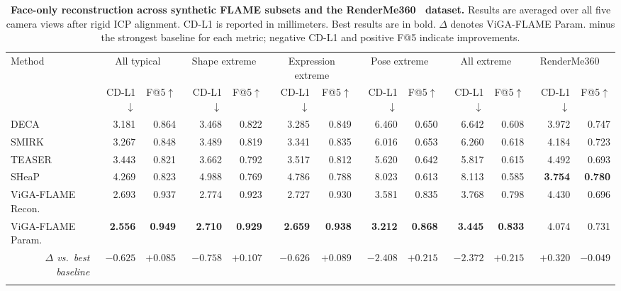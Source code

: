 \begin{table}[htbp]
\centering
\scriptsize
\renewcommand{\arraystretch}{0.95}
\caption{\textbf{Face-only reconstruction across synthetic FLAME subsets and the RenderMe360~\cite{pan2023renderme} dataset.}
Results are averaged over all five camera views after rigid ICP alignment.
CD-L1 is reported in millimeters. Best results are in bold.
$\Delta$ denotes ViGA-FLAME Param. minus the strongest baseline for each metric;
negative CD-L1 and positive F@5 indicate improvements.
}
\label{tab:fixed_yaw_cross_regime}
\begin{tabular}{@{}lrrrrrrrrrrrr@{}}
\toprule
\multirow{2}{*}{Method} &
\multicolumn{2}{c}{All typical} &
\multicolumn{2}{c}{Shape extreme} &
\multicolumn{2}{c}{Expression extreme} &
\multicolumn{2}{c}{Pose extreme} &
\multicolumn{2}{c}{All extreme} &
\multicolumn{2}{c}{RenderMe360~\cite{pan2023renderme}} \\
\cmidrule(lr){2-3}
\cmidrule(lr){4-5}
\cmidrule(lr){6-7}
\cmidrule(lr){8-9}
\cmidrule(lr){10-11}
\cmidrule(lr){12-13}
&
CD-L1$\downarrow$ & F@5$\uparrow$ &
CD-L1$\downarrow$ & F@5$\uparrow$ &
CD-L1$\downarrow$ & F@5$\uparrow$ &
CD-L1$\downarrow$ & F@5$\uparrow$ &
CD-L1$\downarrow$ & F@5$\uparrow$ &
CD-L1$\downarrow$ & F@5$\uparrow$ \\
\midrule
DECA~\cite{feng2021deca}
& 3.181 & 0.864
& 3.468 & 0.822
& 3.285 & 0.849
& 6.460 & 0.650
& 6.642 & 0.608
& 3.972 & 0.747 \\
SMIRK~\cite{filntisis2024smirk}
& 3.267 & 0.848
& 3.489 & 0.819
& 3.341 & 0.835
& 6.016 & 0.653
& 6.260 & 0.618
& 4.184 & 0.723 \\
TEASER~\cite{liu2025teaser}
& 3.443 & 0.821
& 3.662 & 0.792
& 3.517 & 0.812
& 5.620 & 0.642
& 5.817 & 0.615
& 4.492 & 0.693 \\
SHeaP~\cite{schoneveld2025sheap}
& 4.269 & 0.823
& 4.988 & 0.769
& 4.786 & 0.788
& 8.023 & 0.613
& 8.113 & 0.585
& \textbf{3.754} & \textbf{0.780} \\
\midrule
ViGA-FLAME Recon.
& 2.693 & 0.937
& 2.774 & 0.923
& 2.727 & 0.930
& 3.581 & 0.835
& 3.768 & 0.798
& 4.430 & 0.696 \\
ViGA-FLAME Param.
& \textbf{2.556} & \textbf{0.949}
& \textbf{2.710} & \textbf{0.929}
& \textbf{2.659} & \textbf{0.938}
& \textbf{3.212} & \textbf{0.868}
& \textbf{3.445} & \textbf{0.833}
& 4.074 & 0.731 \\
\multicolumn{1}{r}{\emph{$\Delta$ vs.\ best baseline}} &
$-0.625$ & $+0.085$ &
$-0.758$ & $+0.107$ &
$-0.626$ & $+0.089$ &
$-2.408$ & $+0.215$ &
$-2.372$ & $+0.215$ &
$+0.320$ & $-0.049$ \\
\bottomrule
\vspace{-0.6cm}
\end{tabular}
\end{table}
